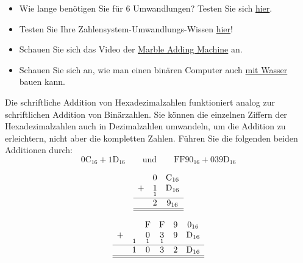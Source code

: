 \begin{mychallenge}\label{challenge:online}
	\begin{itemize}
		\item Wie lange benötigen Sie für 6 Umwandlungen? Testen Sie sich \href{https://oinf.ch/interactive/umrechnen-zwischen-zahlensystemen/}{hier}.
		\item Testen Sie Ihre Zahlensystem-Umwandlungs-Wissen \href{https://oinf.ch/interactive/basiswechsel-10-zu-2/}{hier}!
		\item Schauen Sie sich das Video der \href{https://www.youtube.com/watch?app=desktop&v=GcDshWmhF4A&embeds_referring_euri=https%3A%2F%2Fwww.yaplakal.com%2Fforum28%2Fst%2F125%2Ftopic930979.html&feature=emb_imp_woyt}{Marble Adding Machine} an.
		\item Schauen Sie sich an, wie man einen binären Computer auch \href{https://youtu.be/5wKz1e0ULcg?si=AiPXUniyfU15X11m}{mit Wasser} bauen kann.
	\end{itemize}
\end{mychallenge}

\begin{mychallenge}
	\label{challenge:hexAddition}
	Die schriftliche Addition von Hexadezimalzahlen funktioniert analog zur schriftlichen Addition von Binärzahlen. Sie können die einzelnen Ziffern der Hexadezimalzahlen auch in Dezimalzahlen umwandeln, um die Addition zu erleichtern, nicht aber die kompletten Zahlen. Führen Sie die folgenden beiden Additionen durch:
	$$ 0\text{C}_{16} + 1\text{D}_{16} \qquad \text{und} \qquad \text{FF}90_{16} + 039\text{D}_{16}$$
	\begin{myanswer}
		\[
			\begin{array}{ccc}
				  & 0               & \text{C}_{16}              \\
				+ & \underset{1}{1} & \underset{}{\text{D}_{16}} \\
				\hline
				  & 2               & 9_{16}                     \\
				\hline\hline
			\end{array}
		\]

		\[
			\begin{array}{cccccc}
				  &                & \text{F}        & \text{F}        & 9              & 0_{16}                     \\
				+ & \underset{1}{} & \underset{1}{0} & \underset{1}{3} & \underset{}{9} & \underset{}{\text{D}_{16}} \\
				\hline
				  & 1              & 0               & 3               & 2              & \text{D}_{16}              \\
				\hline\hline
			\end{array}
		\]
	\end{myanswer}
\end{mychallenge}